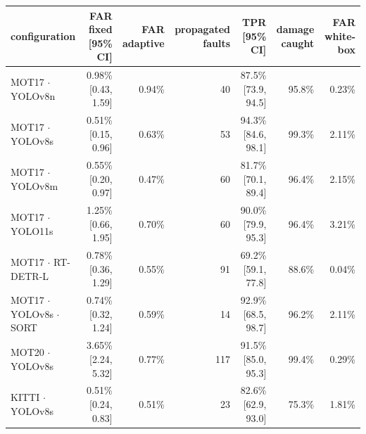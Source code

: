 \begin{tabular}{lrrrrrr}
\toprule
configuration & FAR fixed [95\% CI] & FAR adaptive & propagated faults & TPR [95\% CI] & damage caught & FAR white-box \\
\midrule
MOT17 $\cdot$ YOLOv8n & 0.98\% [0.43, 1.59] & 0.94\% & 40 & 87.5\% [73.9, 94.5] & 95.8\% & 0.23\% \\
MOT17 $\cdot$ YOLOv8s & 0.51\% [0.15, 0.96] & 0.63\% & 53 & 94.3\% [84.6, 98.1] & 99.3\% & 2.11\% \\
MOT17 $\cdot$ YOLOv8m & 0.55\% [0.20, 0.97] & 0.47\% & 60 & 81.7\% [70.1, 89.4] & 96.4\% & 2.15\% \\
MOT17 $\cdot$ YOLO11s & 1.25\% [0.66, 1.95] & 0.70\% & 60 & 90.0\% [79.9, 95.3] & 96.4\% & 3.21\% \\
MOT17 $\cdot$ RT-DETR-L & 0.78\% [0.36, 1.29] & 0.55\% & 91 & 69.2\% [59.1, 77.8] & 88.6\% & 0.04\% \\
MOT17 $\cdot$ YOLOv8s $\cdot$ SORT & 0.74\% [0.32, 1.24] & 0.59\% & 14 & 92.9\% [68.5, 98.7] & 96.2\% & 2.11\% \\
MOT20 $\cdot$ YOLOv8s & 3.65\% [2.24, 5.32] & 0.77\% & 117 & 91.5\% [85.0, 95.3] & 99.4\% & 0.29\% \\
KITTI $\cdot$ YOLOv8s & 0.51\% [0.24, 0.83] & 0.51\% & 23 & 82.6\% [62.9, 93.0] & 75.3\% & 1.81\% \\
\bottomrule
\end{tabular}
